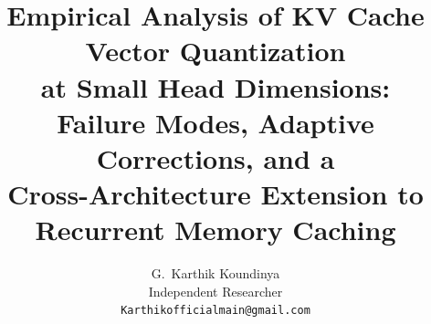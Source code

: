 \documentclass{article}
\title{Empirical Analysis of KV Cache Vector Quantization\\
at Small Head Dimensions:\\
Failure Modes, Adaptive Corrections, and a\\
Cross-Architecture Extension to Recurrent Memory Caching}
\author{
    G.~Karthik Koundinya \\
    Independent Researcher \\
    \texttt{Karthikofficialmain@gmail.com}
}
\begin{document}
\maketitle
\fancyhead{}
\renewcommand{\headrulewidth}{0pt}















\newpage
\appendix




\end{document}
